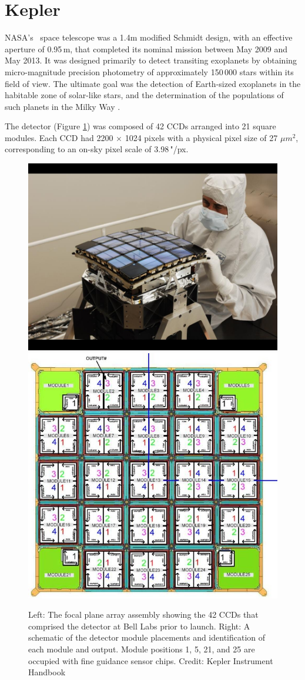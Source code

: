 \section{Kepler}
NASA's \Kepler~space telescope was a 1.4m modified Schmidt design, with an effective aperture of 0.95\,m, that completed its nominal mission between May 2009 and May 2013. It was designed primarily to detect transiting exoplanets by obtaining micro-magnitude precision photometry of approximately 150\,000 stars within its field of view. The ultimate goal was the detection of Earth-sized exoplanets in the habitable zone of solar-like stars, and the determination of the populations of such planets in the Milky Way \citep{koch_kepler_2010}.

The detector (Figure \ref{fig:Kep_detect}) was composed of 42 CCDs arranged into 21 square modules. Each CCD had 2200 $\times$ 1024 pixels with a physical pixel size of 27 $\mu m^2$, corresponding to an on-sky pixel scale of 3.98\,"/px. %

\begin{figure}[htbp]
    \centering
    \includegraphics[width=0.45\linewidth]{Chapter1/Kepler_detector.jpg}
    \includegraphics[width=0.45\linewidth]{Chapter1/kepCCD.jpg}
    \caption[Kepler CCD detector array prior to installation]{Left: The focal plane array assembly showing the 42 CCDs that comprised the detector at Bell Labs prior to launch. Right: A schematic of the detector module placements and identification of each module and output. Module positions 1, 5, 21, and 25 are occupied with fine guidance sensor chips. Credit: Kepler Instrument Handbook}
    \label{fig:Kep_detect}
\end{figure}

